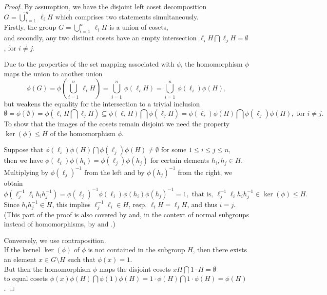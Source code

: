 \documentclass{amsart}
\theoremstyle{definition}
\numberwithin{equation}{section}
\begin{document}
\begin{proof}
By assumption,
we have the disjoint left coset decomposition \(G=\dot{\bigcup}_{i=1}^n\,\ell_iH\)
which comprises two statements simultaneously.\\
Firstly,
the group \(G=\bigcup_{i=1}^n\,\ell_iH\) is a union of cosets,\\
and secondly,
any two distinct cosets have an empty intersection \(\ell_iH\bigcap \ell_jH=\emptyset\), for \(i\ne j\).

Due to the properties of the set mapping associated with \(\phi\),
the homomorphism \(\phi\) maps the union to another union
\[\phi(G)=\phi(\bigcup_{i=1}^n\,\ell_iH)=\bigcup_{i=1}^n\,\phi(\ell_iH)=\bigcup_{i=1}^n\,\phi(\ell_i)\phi(H),\]
but weakens the equality for the intersection to a trivial inclusion
\[\emptyset=\phi(\emptyset)=\phi(\ell_iH\bigcap \ell_jH)\subseteq\phi(\ell_iH)\bigcap\phi(\ell_jH)
=\phi(\ell_i)\phi(H)\bigcap\phi(\ell_j)\phi(H), \text{ for } i\ne j.\]
To show that the images of the cosets remain disjoint
we need the property \(\ker(\phi)\le H\) of the homomorphism \(\phi\).

Suppose that \(\phi(\ell_i)\phi(H)\bigcap\phi(\ell_j)\phi(H)\ne\emptyset\) for some \(1\le i\le j\le n\),\\
then we have \(\phi(\ell_i)\phi(h_i)=\phi(\ell_j)\phi(h_j)\) for certain elements \(h_i,h_j\in H\).\\
Multiplying by \(\phi(\ell_j)^{-1}\) from the left and by \(\phi(h_j)^{-1}\) from the right, we obtain
\[\phi(\ell_j^{-1}\ell_ih_ih_j^{-1})=\phi(\ell_j)^{-1}\phi(\ell_i)\phi(h_i)\phi(h_j)^{-1}=1, \text{ that is, }
\ell_j^{-1}\ell_ih_ih_j^{-1}\in\ker(\phi)\le H.\]
Since \(h_ih_j^{-1}\in H\), this implies \(\ell_j^{-1}\ell_i\in H\), resp. \(\ell_iH=\ell_jH\), and thus \(i=j\).
(This part of the proof is also covered by
\cite[Thm.X.21, p.340]{Is}
and, in the context of normal subgroups instead of homomorphisms, by
\cite[Thm.2.3.4, p.29]{Hl}
and
\cite[Satz 3.10, p.16]{Hp}.)

Conversely, we use contraposition.\\
If the kernel \(\ker(\phi)\) of \(\phi\) is not contained in the subgroup \(H\),
then there exists an element \(x\in G\setminus H\) such that \(\phi(x)=1\).\\
But then the homomorphism \(\phi\) maps the disjoint cosets \(xH\bigcap 1\cdot H=\emptyset\)\\
to equal cosets \(\phi(x)\phi(H)\bigcap\phi(1)\phi(H)=1\cdot\phi(H)\bigcap 1\cdot\phi(H)=\phi(H)\).

\end{proof}
\end{document}
